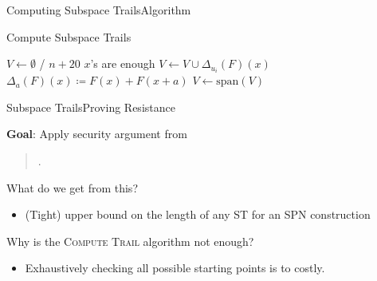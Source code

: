 \begin{frame}{Computing Subspace Trails}{Algorithm}
    \centering
    \begin{minipage}{0.7\textwidth}
    \centering
    \begin{block}{Compute Subspace Trails}
    \begin{algorithmic}[1]
        \Statex{}
            \State{}
        \EndIf{}
        \State{}$V \leftarrow \emptyset$
            \label{alg:compute_trail_1line}
                \Comment \eg/ $n+20$ $x$'s are enough
                \State{} $V \leftarrow V \cup \Delta_{u_i}(F)(x)$\label{alg:compute_trail_2line}
                \Comment $\Delta_a(F)(x) \coloneqq F(x) + F(x+a)$
            \EndFor{}
        \EndFor{}
        \State{}$V \leftarrow \mathrm{span}(V)$
        \State{}
        \EndFunction{}
    \end{algorithmic}
    \end{block}
    \end{minipage}
\end{frame}

\begin{frame}{Subspace Trails}{Proving Resistance}
    \begin{block}{\textbf{Goal}: Apply security argument from}
    \begin{quote}
        .
    \end{quote}
    \end{block}
    \begin{exampleblock}{What do we get from this?}
        \begin{itemize}
            \item (Tight) upper bound on the length of any ST for an SPN construction
        \end{itemize}
    \end{exampleblock}
    \begin{alertblock}{Why is the \textsc{Compute Trail} algorithm not enough?}
        \begin{itemize}
            \item Exhaustively checking all possible starting points is to costly.
        \end{itemize}
    \end{alertblock}
\end{frame}


